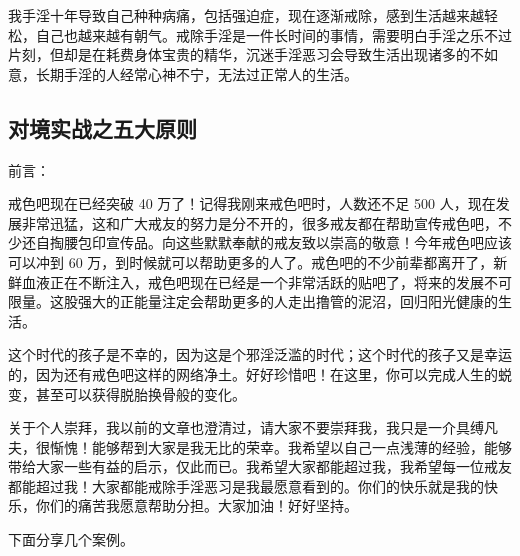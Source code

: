 \begin{case}[强迫症]
    我手淫十年导致自己种种病痛，包括强迫症，现在逐渐戒除，感到生活越来越轻松，自己也越来越有朝气。戒除手淫是一件长时间的事情，需要明白手淫之乐不过片刻，但却是在耗费身体宝贵的精华，沉迷手淫恶习会导致生活出现诸多的不如意，长期手淫的人经常心神不宁，无法过正常人的生活。
\end{case}

\subsection{对境实战之五大原则}

前言：

戒色吧现在已经突破 40 万了！记得我刚来戒色吧时，人数还不足 500 人，现在发展非常迅猛，这和广大戒友的努力是分不开的，很多戒友都在帮助宣传戒色吧，不少还自掏腰包印宣传品。向这些默默奉献的戒友致以崇高的敬意！今年戒色吧应该可以冲到 60 万，到时候就可以帮助更多的人了。戒色吧的不少前辈都离开了，新鲜血液正在不断注入，戒色吧现在已经是一个非常活跃的贴吧了，将来的发展不可限量。这股强大的正能量注定会帮助更多的人走出撸管的泥沼，回归阳光健康的生活。

这个时代的孩子是不幸的，因为这是个邪淫泛滥的时代；这个时代的孩子又是幸运的，因为还有戒色吧这样的网络净土。好好珍惜吧！在这里，你可以完成人生的蜕变，甚至可以获得脱胎换骨般的变化。

关于个人崇拜，我以前的文章也澄清过，请大家不要崇拜我，我只是一介具缚凡夫，很惭愧！能够帮到大家是我无比的荣幸。我希望以自己一点浅薄的经验，能够带给大家一些有益的启示，仅此而已。我希望大家都能超过我，我希望每一位戒友都能超过我！大家都能戒除手淫恶习是我最愿意看到的。你们的快乐就是我的快乐，你们的痛苦我愿意帮助分担。大家加油！好好坚持。

下面分享几个案例。


